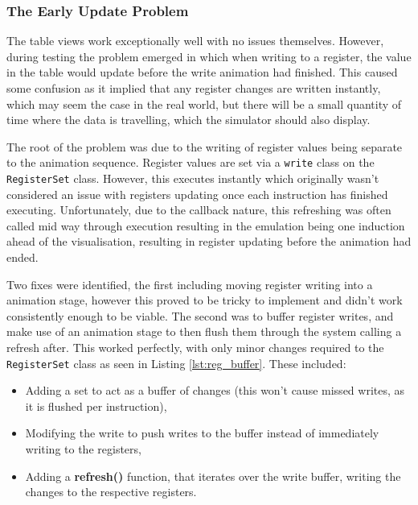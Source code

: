\subsubsection{The Early Update Problem}\label{sec:early_update_prob}
The table views work exceptionally well with no issues themselves. However, during testing the problem emerged in which when writing to a register, the value in the table would update before the write animation had finished. This caused some confusion as it implied that any register changes are written instantly, which may seem the case in the real world, but there will be a small quantity of time where the data is travelling, which the simulator should also display.

The root of the problem was due to the writing of register values being separate to the animation sequence. Register values are set via a \verb|write| class on the \texttt{RegisterSet} class. However, this executes instantly which originally wasn't considered an issue with registers updating once each instruction has finished executing. Unfortunately, due to the callback nature, this refreshing was often called mid way through execution resulting in the emulation being one induction ahead of the visualisation, resulting in register updating before the animation had ended.

Two fixes were identified, the first including moving register writing into a animation stage, however this proved to be tricky to implement and didn't work consistently enough to be viable. The second was to buffer register writes, and make use of an animation stage to then flush them through the system calling a refresh after. This worked perfectly, with only minor changes required to the \texttt{RegisterSet} class as seen in Listing \ref{lst:reg_buffer}. These included: 
\begin{itemize}
    \item Adding a set to act as a buffer of changes (this won't cause missed writes, as it is flushed per instruction),
    \item Modifying the write to push writes to the buffer instead of immediately writing to the registers,
    \item Adding a \textbf{refresh()} function, that iterates over the write buffer, writing the changes to the respective registers.
\end{itemize}

